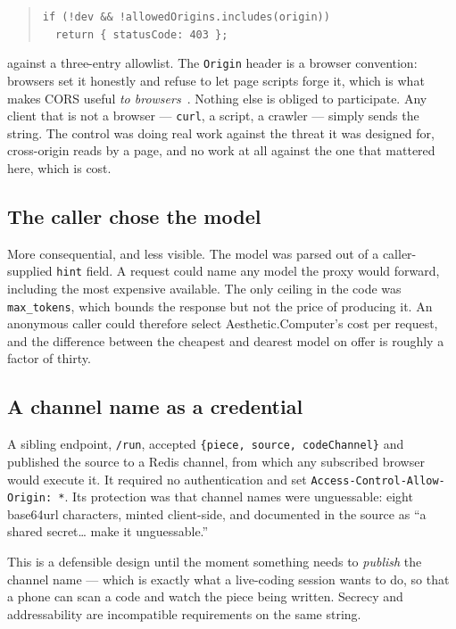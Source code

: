 \documentclass[10pt,letterpaper,twocolumn]{article}
\newcommand{\acdot}{{\color{acpink}.}}
\newcommand{\ac}{Aesthetic{\acdot}Computer}
\newcommand{\code}[1]{\texttt{#1}}
\begin{document}
\begin{quote}
\small\code{if (!dev \&\& !allowedOrigins.includes(origin))}\\
\small\code{\ \ return \{ statusCode: 403 \};}
\end{quote}

\noindent against a three-entry allowlist. The \code{Origin} header is a browser
convention: browsers set it honestly and refuse to let page scripts forge it,
which is what makes CORS useful \emph{to browsers}~\citep{fetchcors}. Nothing else is obliged to
participate. Any client that is not a browser --- \code{curl}, a script, a
crawler --- simply sends the string. The control was doing real work against the
threat it was designed for, cross-origin reads by a page, and no work at all
against the one that mattered here, which is cost.

\subsection{The caller chose the model}

More consequential, and less visible. The model was parsed out of a
caller-supplied \code{hint} field. A request could name any model the proxy
would forward, including the most expensive available. The only ceiling in the
code was \code{max\_tokens}, which bounds the response but not the price of
producing it. An anonymous caller could therefore select \ac{}'s cost per
request, and the difference between the cheapest and dearest model on offer is
roughly a factor of thirty.

\subsection{A channel name as a credential}

A sibling endpoint, \code{/run}, accepted \code{\{piece, source, codeChannel\}}
and published the source to a Redis channel, from which any subscribed browser
would execute it. It required no authentication and set
\code{Access-Control-Allow-Origin: *}. Its protection was that channel names
were unguessable: eight base64url characters, minted client-side, and documented
in the source as ``a shared secret\ldots{} make it unguessable.''

This is a defensible design until the moment something needs to \emph{publish}
the channel name --- which is exactly what a live-coding session wants to do, so
that a phone can scan a code and watch the piece being written. Secrecy and
addressability are incompatible requirements on the same string.
\end{document}
